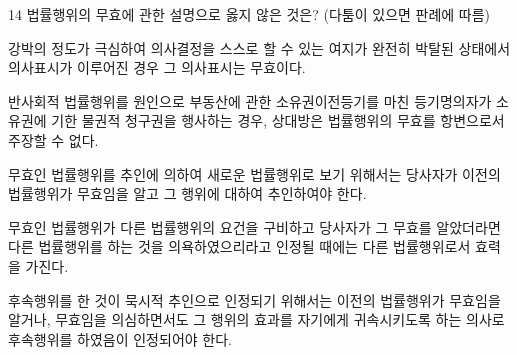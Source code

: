 \begin{question}{14}
법률행위의 무효에 관한 설명으로 옳지 않은 것은? (다툼이 있으면 판례에 따름)
\begin{choices}
  \item 강박의 정도가 극심하여 의사결정을 스스로 할 수 있는 여지가 완전히 박탈된 상태에서 의사표시가 이루어진 경우 그 의사표시는 무효이다.
  \item 반사회적 법률행위를 원인으로 부동산에 관한 소유권이전등기를 마친 등기명의자가 소유권에 기한 물권적 청구권을 행사하는 경우, 상대방은 법률행위의 무효를 항변으로서 주장할 수 없다.
  \item 무효인 법률행위를 추인에 의하여 새로운 법률행위로 보기 위해서는 당사자가 이전의 법률행위가 무효임을 알고 그 행위에 대하여 추인하여야 한다.
  \item 무효인 법률행위가 다른 법률행위의 요건을 구비하고 당사자가 그 무효를 알았더라면 다른 법률행위를 하는 것을 의욕하였으리라고 인정될 때에는 다른 법률행위로서 효력을 가진다.
  \item 후속행위를 한 것이 묵시적 추인으로 인정되기 위해서는 이전의 법률행위가 무효임을 알거나, 무효임을 의심하면서도 그 행위의 효과를 자기에게 귀속시키도록 하는 의사로 후속행위를 하였음이 인정되어야 한다.
\end{choices}
\end{question}
